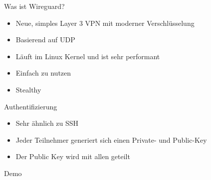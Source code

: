 \documentclass{beamer}
\begin{document}
  \begin{frame}{Was ist Wireguard?}
    \begin{itemize}
      \item Neue, simples Layer 3 VPN mit moderner Verschlüsselung
      \item Basierend auf UDP
      \item Läuft im Linux Kernel und ist sehr performant
      \item Einfach zu nutzen
      \item Stealthy 
    \end{itemize}
  \end{frame}
  \begin{frame}{Authentifizierung}
    \begin{itemize}
      \item Sehr ähnlich zu SSH
      \item Jeder Teilnehmer generiert sich einen Private- und Public-Key
      \item Der Public Key wird mit allen geteilt
    \end{itemize}
  \end{frame}

  \begin{frame}[standout]
    Demo
  \end{frame}
\end{document}
